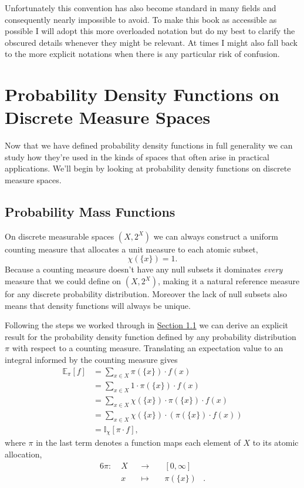 \documentclass[
  letterpaper,
  DIV=11,
  numbers=noendperiod]{scrartcl}
\begin{document}
Unfortunately this convention has also become standard in many fields
and consequently nearly impossible to avoid. To make this book as
accessible as possible I will adopt this more overloaded notation but do
my best to clarify the obscured details whenever they might be relevant.
At times I might also fall back to the more explicit notations when
there is any particular risk of confusion.

\hypertarget{probability-density-functions-on-discrete-measure-spaces}{%
\section{Probability Density Functions on Discrete Measure
Spaces}\label{probability-density-functions-on-discrete-measure-spaces}}

Now that we have defined probability density functions in full
generality we can study how they're used in the kinds of spaces that
often arise in practical applications. We'll begin by looking at
probability density functions on discrete measure spaces.

\hypertarget{probability-mass-functions}{%
\subsection{Probability Mass
Functions}\label{probability-mass-functions}}

On discrete measurable spaces \((X, 2^{X})\) we can always construct a
uniform counting measure that allocates a unit measure to each atomic
subset, \[
\chi( \{ x \} ) = 1.
\] Because a counting measure doesn't have any null subsets it dominates
\emph{every} measure that we could define on \((X, 2^{X})\), making it a
natural reference measure for any discrete probability distribution.
Moreover the lack of null subsets also means that density functions will
always be unique.

Following the steps we worked through in
\href{@sec:finite_densities}{Section 1.1} we can derive an explicit
result for the probability density function defined by any probability
distribution \(\pi\) with respect to a counting measure. Translating an
expectation value to an integral informed by the counting measure gives
\begin{align*}
\mathbb{E}_{\pi}[f]
&=
\sum_{x \in X}
\pi( \{ x \} ) \cdot f(x)
\\
&=
\sum_{x \in X}
1 \cdot \pi( \{ x \} ) \cdot f(x)
\\
&=
\sum_{x \in X}
\chi( \{ x \} ) \cdot \pi( \{ x \} ) \cdot f(x)
\\
&=
\sum_{x \in X}
\chi( \{ x \} ) \cdot \left( \pi( \{ x \} ) \cdot f(x) \right)
\\
&=
\mathbb{I}_{\chi} [ \pi \cdot f ],
\end{align*} where \(\pi\) in the last term denotes a function maps each
element of \(X\) to its atomic allocation, \begin{alignat*}{6}
\pi :\; & X & &\rightarrow& \; & [0, \infty] &
\\
& x & &\mapsto& & \pi( \{ x \} ) &.
\end{alignat*}
\end{document}
